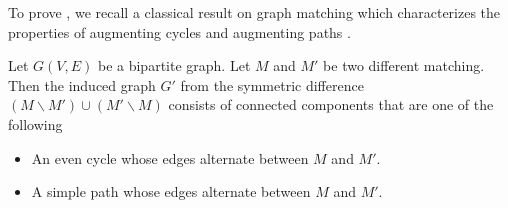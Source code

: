 \documentclass{article}
\newcommand{\del}{\backslash}
\begin{document}
To prove , we recall a classical result on graph matching which characterizes the properties of augmenting cycles and augmenting paths \citep{Berge15091957}.
\begin{lemma}
\label{lemma:match}
Let $G(V,E)$ be a bipartite graph.
Let $M$ and $M'$ be two different matching.
Then the induced graph $G'$ from the symmetric difference $(M\del M')\cup (M'\del M)$ consists of connected components that are one of the following
\begin{itemize}
\item An even cycle whose edges alternate between $M$ and $M'$.
\item A simple path whose edges alternate between $M$ and $M'$.
\end{itemize}
\end{lemma}
\end{document}

